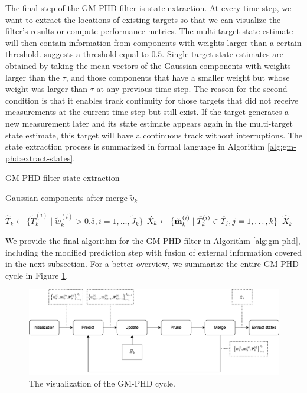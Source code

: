 The final step of the GM-PHD filter is state extraction. At every time step, we want to extract the locations of existing targets so that we can visualize the filter's results or compute performance metrics. The multi-target state estimate will then contain information from components with weights larger than a certain threshold. \cite{voGaussianMixtureProbability2006} suggests a threshold equal to $0.5$. Single-target state estimates are obtained by taking the mean vectors of the Gaussian components with weights larger than the $\tau$, and those components that have a smaller weight but whose weight was larger than $\tau$ at any previous time step. The reason for the second condition is that it enables track continuity for those targets that did not receive measurements at the current time step but still exist. If the target generates a new measurement later and its state estimate appears again in the multi-target state estimate, this target will have a continuous track without interruptions. The state extraction process is summarized in formal language in Algorithm \ref{alg:gm-phd:extract-states}.

\begin{algorithm}
\caption{GM-PHD filter state extraction}\label{alg:gm-phd:extract-states}
\begin{algorithmic}[1]
    \Require Gaussian components after merge $\tilde{v}_k$
    \item[]
        \State $\hat{T}_k \gets \{ \tilde{T}_k^{(i)} \mid \tilde{w}_{k}^{(i)} > 0.5 , i = 1, \ldots, \tilde{J}_{k}\}$
        \State $\hat{X}_k \gets \{ \vecat{\tilde{m}}{k}^{(i)} \mid \tilde{T}_{k}^{(i)} \in \hat{T}_j, j = 1, \ldots, k \}$
        \State \Return $\hat{X}_k$
    \EndProcedure
\end{algorithmic}
\end{algorithm}

We provide the final algorithm for the GM-PHD filter in Algorithm \ref{alg:gm-phd}, including the modified prediction step with fusion of external information covered in the next subsection. For a better overview, we summarize the entire GM-PHD cycle in Figure \ref{fig:gm-phd-cycle}.

\begin{figure}
    \centering
    \includegraphics[width=.95\linewidth]{figures/gm-phd-cycle.png}
    \caption[GM-PHD Cycle.]{The visualization of the GM-PHD cycle.}
    \label{fig:gm-phd-cycle}
\end{figure}
